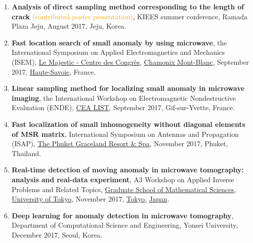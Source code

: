\documentclass[10pt,A4]{article}
\begin{document}
\begin{enumerate}
\item\label{P-KIEES2017B} \textbf{Analysis of direct sampling method corresponding to the length of crack} \textcolor{orange}{(contributed poster presentation)}, KIEES summer conference, Ramada Plaza Jeju, August 2017, Jeju, Korea.
\item\label{P-ISEM2017} \textbf{Fast location search of small anomaly by using microwave}, the  International Symposium on Applied Electromagnetics and Mechanics (ISEM), \href{http://www.chamonix.com/centre-des-congres-le-majestic,48-63803,fr.html}{Le Majestic - Centre des Congr{\`e}s}, \href{http://www.chamonix.com}{Chamonix Mont-Blanc}, September 2017, \href{https://www.hautesavoie.fr}{Haute-Savoie}, France.
\item\label{P-ENDE2017} \textbf{Linear sampling method for localizing small anomaly in microwave imaging}, the  International Workshop on Electromagnetic Nondestructive Evaluation (ENDE), \href{https://www-list.cea.fr/}{CEA LIST}, September 2017, Gif-sur-Yvette, France.
\item\label{P-ISAP2017} \textbf{Fast localization of small inhomogeneity without diagonal elements of MSR matrix}, International Symposium on Antennas and Propagation (ISAP), \href{http://www.phuketgraceland.com/}{The Phuket Graceland Resort \& Spa}, November 2017, Phuket, Thailand.
\item\label{P-TOKYO2017} \textbf{Real-time detection of moving anomaly in microwave tomography: analysis and real-data experiment}, A3 Workshop on Applied Inverse Problems and Related Topics, \href{http://www.ms.u-tokyo.ac.jp}{Graduate School of Mathematical Sciences}, \href{http://www.u-tokyo.ac.jp/en/}{University of Tokyo}, November 2017, \href{https://www.metro.tokyo.lg.jp}{Tokyo}, \href{https://www.japan.go.jp}{Japan}.
\item\label{P-CSE2017B} \textbf{Deep learning for anomaly detection in microwave tomography}, Department of Computational Science and Engineering, Yonsei University, December 2017, Seoul, Korea.

\end{enumerate}
\end{document}
